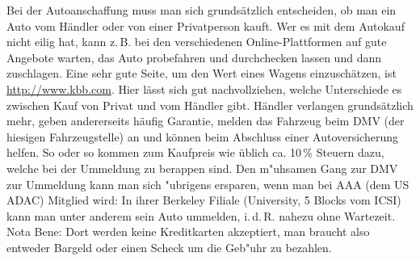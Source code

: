 \documentclass[a4paper]{scrreprt}
\begin{document}
Bei der Autoanschaffung muss man sich grundsätzlich entscheiden, ob man ein Auto vom Händler oder von einer Privatperson kauft. 
Wer es mit dem Autokauf nicht eilig hat, kann z.\,B. bei den verschiedenen Online-Plattformen auf gute Angebote warten, das Auto probefahren und durchchecken lassen und dann zuschlagen. 
Eine sehr gute Seite, um den Wert eines Wagens einzuschätzen, ist \url{http://www.kbb.com}. 
Hier lässt sich gut nachvollziehen, welche Unterschiede es zwischen Kauf von Privat und vom Händler gibt. 
Händler verlangen grundsätzlich mehr, geben andererseits häufig Garantie, melden das Fahrzeug beim DMV (der hiesigen Fahrzeugstelle) an und können beim Abschluss einer Autoversicherung helfen. 
So oder so kommen zum Kaufpreis wie üblich ca. 10\,\% Steuern dazu, welche bei der Ummeldung zu berappen sind.
Den m"uhsamen Gang zur DMV zur Ummeldung kann man sich "ubrigens ersparen, wenn man bei AAA (dem US ADAC) Mitglied wird: In ihrer Berkeley Filiale (University, 5 Blocks vom ICSI) kann man unter anderem sein Auto ummelden, i.\,d.\,R. nahezu ohne Wartezeit.
Nota Bene: Dort werden keine Kreditkarten akzeptiert, man braucht also entweder Bargeld oder einen Scheck um die Geb"uhr zu bezahlen.
\end{document}
